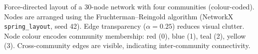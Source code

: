 \caption{Force-directed layout of a 30-node network with four communities (colour-coded). Nodes are arranged using the Fruchterman--Reingold algorithm (NetworkX \texttt{spring\_layout}, seed 42). Edge transparency ($\alpha = 0.25$) reduces visual clutter. Node colour encodes community membership: red (0), blue (1), teal (2), yellow (3). Cross-community edges are visible, indicating inter-community connectivity.}
